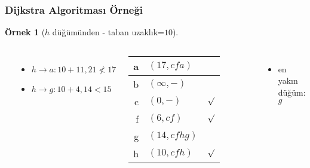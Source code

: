 \documentclass[dvipsnames]{beamer}
\theoremstyle{definition}
\theoremstyle{example}
\newtheorem{ornek}[theorem]{Örnek}
\theoremstyle{plain}
\begin{document}
\begin{frame}
  \frametitle{Dijkstra Algoritması Örneği}

  \begin{ornek}[$h$ düğümünden - taban uzaklık=$10$]
    \begin{columns}
      \begin{center}
      \end{center}

      \begin{itemize}
        \item $h \rightarrow a: 10+11, 21 \nless 17$
        \item $h \rightarrow g: 10+4, 14 < 15$
      \end{itemize}

      \pause
      \begin{table}
        \begin{tabular}{r|l|c}
          a & $(17,cfa)$   & \\\hline
          b & $(\infty,-)$ & \\\hline
          c & $(0,-)$      & $\surd$ \\\hline
          f & $(6,cf)$     & $\surd$ \\\hline
          g & $(14,cfhg)$  & \\\hline
          h & $(10,cfh)$   & $\surd$
        \end{tabular}
      \end{table}

      \pause
      \begin{itemize}
        \item en yakın düğüm: $g$
      \end{itemize}
    \end{columns}
  \end{ornek}
\end{frame}
\end{document}
